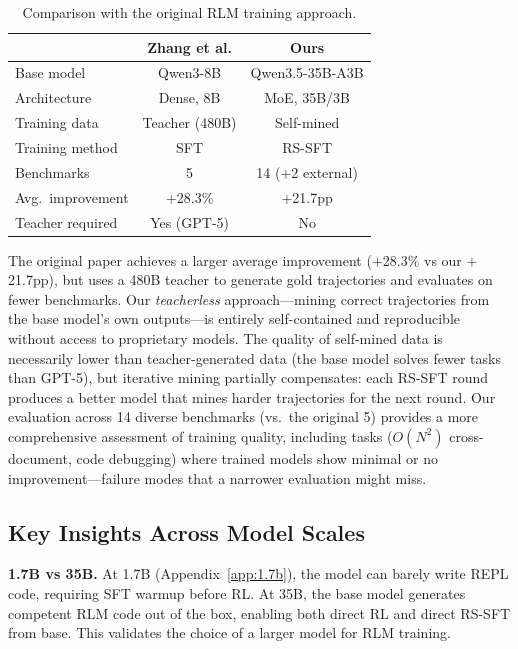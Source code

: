 \documentclass{article}
\begin{document}
\begin{table}[t]
\caption{Comparison with the original RLM training approach.}
\label{tab:comparison-zhang}
\vskip 0.1in
\begin{center}
\begin{small}
\begin{tabular}{lcc}
\toprule
& Zhang et al. & Ours \\
\midrule
Base model & Qwen3-8B & Qwen3.5-35B-A3B \\
Architecture & Dense, 8B & MoE, 35B/3B \\
Training data & Teacher (480B) & Self-mined \\
Training method & SFT & RS-SFT \\
Benchmarks & 5 & 14 (+2 external) \\
Avg.\ improvement & +28.3\% & +21.7pp \\
Teacher required & Yes (GPT-5) & No \\
\bottomrule
\end{tabular}
\end{small}
\end{center}
\vskip -0.15in
\end{table}

The original paper achieves a larger average improvement ($+$28.3\% vs our $+$21.7pp), but uses a 480B teacher to generate gold trajectories and evaluates on fewer benchmarks. Our \emph{teacherless} approach---mining correct trajectories from the base model's own outputs---is entirely self-contained and reproducible without access to proprietary models. The quality of self-mined data is necessarily lower than teacher-generated data (the base model solves fewer tasks than GPT-5), but iterative mining partially compensates: each RS-SFT round produces a better model that mines harder trajectories for the next round. Our evaluation across 14 diverse benchmarks (vs.\ the original 5) provides a more comprehensive assessment of training quality, including tasks ($O(N^2)$ cross-document, code debugging) where trained models show minimal or no improvement---failure modes that a narrower evaluation might miss.

\subsection{Key Insights Across Model Scales}

\textbf{1.7B vs 35B.} At 1.7B (Appendix~\ref{app:1.7b}), the model can barely write REPL code, requiring SFT warmup before RL. At 35B, the base model generates competent RLM code out of the box, enabling both direct RL and direct RS-SFT from base. This validates the choice of a larger model for RLM training.
\end{document}
